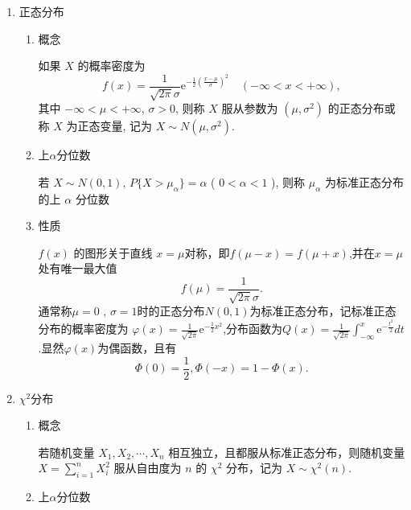 \begin{enumerate}
    \item 正态分布
          \begin{enumerate}
              \item 概念

                    如果 $X$ 的概率密度为
                    $$f(x) = \frac{1}{\sqrt{2 \pi} \sigma} \mathrm{e}^{-\frac{1}{2} \left( \frac{x - \mu}{\sigma} \right)^2} \quad (-\infty < x < +\infty),$$
                    其中 $-\infty < \mu < +\infty$, $\sigma > 0$, 则称 $X$ 服从参数为 $(\mu, \sigma^2)$ 的正态分布或称 $X$ 为正态变量, 记为 $X \sim N(\mu, \sigma^2)$.
              \item 上$\alpha$分位数

                    若 $X \sim N(0, 1)$, $P\{X > \mu_\alpha\} = \alpha$ ( $0 < \alpha < 1$ ), 则称 $\mu_\alpha$ 为标准正态分布的上 $\alpha$ 分位数
              \item 性质

                    $f(x)$ 的图形关于直线 $x=\mu$对称，即$f(\mu-x)=f(\mu+x)$,并在$x=\mu$处有唯一最大值
                    $$f(\mu)=\frac{1}{\sqrt{2\pi}\sigma}.$$
                    通常称$\mu=0$ , $\sigma=1$时的正态分布$N(0,1)$为标准正态分布，记标准正态分布的概率密度为
                    $\varphi(x)=\frac{1}{\sqrt{2\pi}}\mathrm{e}^{-\frac{1}{2}x^{2}}$,分布函数为$Q(x)=\frac1{\sqrt{2\pi}}\int_{-\infty}^{x}\mathrm{e}^{-\frac{t^{2}}{2}}dt$ .显然$\varphi(x)$为偶函数，且有
                    $$\Phi(0)=\frac{1}{2},\Phi(-x)=1-\Phi(x).$$
          \end{enumerate}
    \item $\chi^2$分布
          \begin{enumerate}
              \item 概念

                    若随机变量 $X_{1}, X_{2}, \cdots, X_{n}$ 相互独立，且都服从标准正态分布，则随机变量 $X = \sum_{i=1}^{n} X_{i}^{2}$ 服从自由度为 $n$ 的 $\chi^{2}$ 分布，记为 $X \sim \chi^{2}(n)$.
              \item 上$\alpha$分位数


\end{enumerate}
\end{enumerate}
